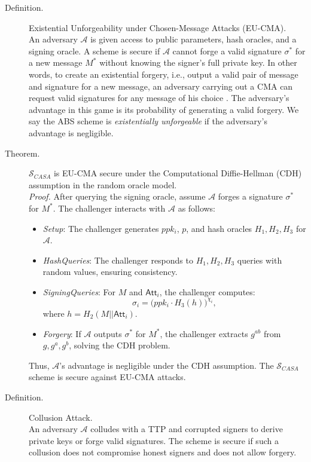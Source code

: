 \begin{description}
    \item[Definition.] Existential Unforgeability under Chosen-Message Attacks (EU-CMA).\\
    An adversary $\mathcal{A}$ is given access to public parameters, hash oracles, and a signing oracle.
    A scheme is secure if $\mathcal{A}$ cannot forge a valid signature $\sigma^*$ for a new message $M^*$ without knowing the signer's full private key.
    In other words, to create an existential forgery, i.e., output a valid pair of message and signature for a new message, an adversary carrying out a CMA can request valid signatures for any message of his choice \cite{Goldwasser1988}.
    The adversary's advantage in this game is its probability of generating a valid forgery.
    We say the ABS scheme is \textit{existentially unforgeable} if the adversary's advantage is negligible.

    \item[Theorem.] $\mathcal{S}_{CASA}$ is EU-CMA secure under the Computational Diffie-Hellman (CDH) assumption in the random oracle model.\\
    \textit{Proof.} After querying the signing oracle, assume $\mathcal{A}$ forges a signature $\sigma^*$ for $M^*$. The challenger interacts with $\mathcal{A}$ as follows:
    \begin{itemize}
        \item \textit{Setup}: The challenger generates $ppk_i$, $p$, and hash oracles \( H_1, H_2, H_3 \) for \( \mathcal{A} \).
        \item \textit{HashQueries}: The challenger responds to \( H_1, H_2, H_3 \) queries with random values, ensuring consistency.
        \item \textit{SigningQueries}: For $M$ and $\mathsf{Att}_{i}$, the challenger computes:
        \[
        \sigma_i = \big(ppk_{i} \cdot H_3(h)\big)^{\chi_i},
        \]
        where $h = H_2(M || \mathsf{Att}_{i})$.
        \item \textit{Forgery}: If \( \mathcal{A} \) outputs \( \sigma^* \) for \( M^* \), the challenger extracts \( g^{ab} \) from \( g, g^a, g^b \), solving the CDH problem.
    \end{itemize}
    Thus, $\mathcal{A}$'s advantage is negligible under the CDH assumption.
    The $\mathcal{S}_{CASA}$ scheme is secure against EU-CMA attacks.

    \item[Definition.] Collusion Attack.\\
    An adversary $\mathcal{A}$ colludes with a TTP and corrupted signers to derive private keys or forge valid signatures.
    The scheme is secure if such a collusion does not compromise honest signers and does not allow forgery.


\end{description}
